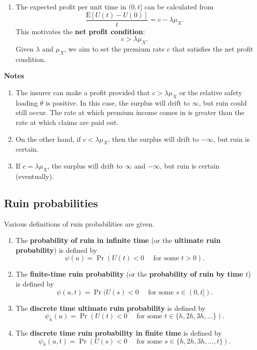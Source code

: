 \documentclass[landscape, 20pt]{extreport}
\providecommand{\tightlist}{%
  \setlength{\itemsep}{0pt}\setlength{\parskip}{0pt}}
\theoremstyle{definition}
\theoremstyle{definition}
\theoremstyle{definition}
\theoremstyle{definition}
\theoremstyle{remark}
\begin{document}
\begin{enumerate}
\def\labelenumi{\arabic{enumi}.}
\setcounter{enumi}{1}
\tightlist
\item
  The expected profit per unit time in \((0, t]\) can be calculated from
  \[\frac{\mathrm{E}[U(t) - U(0)]}{t} = c - \lambda \mu_X.\]
  This motivates the \textbf{net profit condition}:
  \[c > \lambda \mu_X.  \]
  Given \(\lambda\) and \(\mu_X\), we aim to set the premium rate \(c\) that satisfies the net profit condition.
\end{enumerate}

\textbf{Notes}

\begin{enumerate}
\def\labelenumi{\arabic{enumi}.}
\item
  The insurer can make a profit provided that \(c > \lambda \mu_X\) or
  the relative safety loading \(\theta\) is positive. In this case, the
  surplus will drift to \(\infty\), but ruin could still occur. The rate
  at which premium income comes in is greater than the rate at which
  claims are paid out.
\item
  On the other hand, if \(c < \lambda \mu_X\), then the surplus will
  drift to \(-\infty\), but ruin is certain.
\item
  If \(c = \lambda \mu_X\), the surplus will drift to \(\infty\) and \(-\infty\), but ruin is certain (eventually).
\end{enumerate}

\hypertarget{ruin-probabilities}{%
\subsection{Ruin probabilities}\label{ruin-probabilities}}

Various definitions of ruin probabilities are given.

\begin{enumerate}
\def\labelenumi{\arabic{enumi}.}
\item
  The \textbf{probability of ruin in infinite time} (or the \textbf{ultimate ruin
  probability}) is defined by
  \[\psi(u) = \Pr(U(t) < 0 \quad \text{ for some } t > 0).\]
\item
  The \textbf{finite-time ruin probability} (or the \textbf{probability of ruin
  by time \(t\)}) is defined by
  \[\psi(u,t) = \Pr(U(s) < 0 \quad \text{ for some } s \in (0,t]).\]
\item
  The \textbf{discrete time ultimate ruin probability} is defined by
  \[\psi_h(u) = \Pr(U(t) < 0 \quad \text{ for some } t \in \{h, 2h, 3h, \ldots \}).\]
\item
  The \textbf{discrete time ruin probability in finite time} is defined by
  \[\psi_h(u,t) = \Pr(U(s) < 0 \quad \text{ for some } s \in \{h, 2h, 3h, \ldots, t\}).\]
\end{enumerate}
\end{document}
